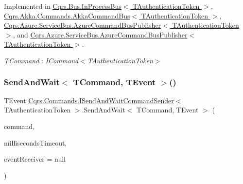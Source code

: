 Implemented in \hyperlink{classCqrs_1_1Bus_1_1InProcessBus_a506d617dc7ec3838791a91e09b73b8ce_a506d617dc7ec3838791a91e09b73b8ce}{Cqrs.\+Bus.\+In\+Process\+Bus$<$ T\+Authentication\+Token $>$}, \hyperlink{classCqrs_1_1Akka_1_1Commands_1_1AkkaCommandBus_a10ed94fc318977777e2e6cc970b8953e_a10ed94fc318977777e2e6cc970b8953e}{Cqrs.\+Akka.\+Commands.\+Akka\+Command\+Bus$<$ T\+Authentication\+Token $>$}, \hyperlink{classCqrs_1_1Azure_1_1ServiceBus_1_1AzureCommandBusPublisher_a6051d608d81618549709731471ca904a_a6051d608d81618549709731471ca904a}{Cqrs.\+Azure.\+Service\+Bus.\+Azure\+Command\+Bus\+Publisher$<$ T\+Authentication\+Token $>$}, and \hyperlink{classCqrs_1_1Azure_1_1ServiceBus_1_1AzureCommandBusPublisher_a6051d608d81618549709731471ca904a_a6051d608d81618549709731471ca904a}{Cqrs.\+Azure.\+Service\+Bus.\+Azure\+Command\+Bus\+Publisher$<$ T\+Authentication\+Token $>$}.

\begin{Desc}
\item[Type Constraints]\begin{description}
\item[{\em T\+Command} : {\em I\+Command$<$T\+Authentication\+Token$>$}]\end{description}
\end{Desc}
\mbox{\label{interfaceCqrs_1_1Commands_1_1ISendAndWaitCommandSender_aceee36522f8b677f3737ff0f9f2165ad_aceee36522f8b677f3737ff0f9f2165ad}} 
\subsubsection{\texorpdfstring{Send\+And\+Wait$<$ T\+Command, T\+Event $>$()}{SendAndWait< TCommand, TEvent >()}\hspace{0.1cm}{\footnotesize\ttfamily [2/6]}}
{\footnotesize\ttfamily T\+Event \hyperlink{interfaceCqrs_1_1Commands_1_1ISendAndWaitCommandSender}{Cqrs.\+Commands.\+I\+Send\+And\+Wait\+Command\+Sender}$<$ T\+Authentication\+Token $>$.Send\+And\+Wait$<$ T\+Command, T\+Event $>$ (\begin{DoxyParamCaption}\item[{T\+Command}]{command,  }\item[{int}]{milliseconds\+Timeout,  }\item[{\hyperlink{interfaceCqrs_1_1Events_1_1IEventReceiver}{I\+Event\+Receiver}$<$ T\+Authentication\+Token $>$}]{event\+Receiver = {\ttfamily null} }\end{DoxyParamCaption})}



